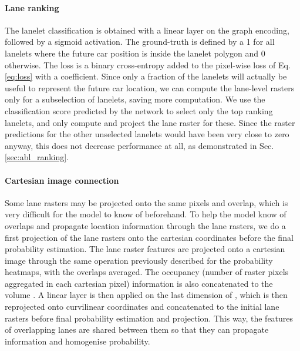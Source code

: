 \documentclass[letterpaper, 10 pt, conference]{ieeeconf}
\begin{document}
\paragraph{Lane ranking}
The lanelet classification is obtained with a linear layer on the graph encoding, followed by a sigmoid activation. The ground-truth is defined by a 1 for all lanelets where the future car position is inside the lanelet polygon and 0 otherwise. The loss is a binary cross-entropy added to the pixel-wise loss of Eq. \ref{eq:loss} with a  coefficient.
Since only a fraction of the lanelets will actually be useful to represent the future car location, we can compute the lane-level rasters only for a subselection of lanelets, saving more computation. We use the classification score  predicted by the network to select only the top  ranking lanelets, and only compute and project the lane raster for these. Since the raster predictions for the other unselected lanelets would have been very close to zero anyway, this does not decrease performance at all, as demonstrated in Sec. \ref{sec:abl_ranking}.

\paragraph{Cartesian image connection} Some lane rasters may be projected onto the same pixels and overlap, which is very difficult for the model to know of beforehand. 
To help the model know of overlaps and propagate location information through the lane rasters, we do a first projection of the lane rasters onto the cartesian coordinates before the final probability estimation. The  lane raster features  are projected onto a  cartesian image  through the same operation previously described for the probability heatmaps, with the overlaps averaged. The occupancy (number of raster pixels aggregated in each cartesian pixel) information is also concatenated to the volume  . A linear layer is then applied on the last dimension of , which is then reprojected onto curvilinear coordinates and concatenated to the initial lane rasters  before final probability estimation and projection. This way, the features of overlapping lanes are shared between them so that they can propagate information and homogenise probability.
\end{document}
